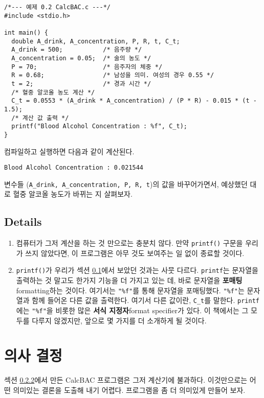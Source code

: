 \documentclass[../main.tex]{subfiles}
\begin{document}
\begin{verbatim}
/*--- 예제 0.2 CalcBAC.c ---*/
#include <stdio.h>

int main() {
  double A_drink, A_concentration, P, R, t, C_t;
  A_drink = 500;           /* 음주량 */
  A_concentration = 0.05;  /* 술의 농도 */
  P = 70;                  /* 음주자의 체중 */
  R = 0.68;                /* 남성을 의미. 여성의 경우 0.55 */
  t = 2;                   /* 경과 시간 */
  /* 혈중 알코올 농도 계산 */
  C_t = 0.0553 * (A_drink * A_concentration) / (P * R) - 0.015 * (t - 1.5);
  /* 계산 값 출력 */
  printf("Blood Alcohol Concentration : %f", C_t);
}
\end{verbatim}

컴파일하고 실행하면 다음과 같이 계산된다.
\begin{verbatim}
Blood Alcohol Concentration : 0.021544
\end{verbatim}

변수들 (\texttt{A\_drink, A\_concentration, P, R, t})의 값을
바꾸어가면서, 예상했던 대로 혈중 알코올 농도가 바뀌는 지 살펴보자.

\subsection{Details}
\begin{enumerate}
\item 컴퓨터가 그저 계산을 하는 것 만으로는 충분치 않다. 만약
  \texttt{printf()} 구문을 우리가 쓰지 않았다면, 이 프로그램은 아무
  것도 보여주는 일 없이 종료할 것이다. 
\item \texttt{printf()}가 우리가 섹션 \hyperref[sec:0.1]{0.1}에서
  보았던 것과는 사뭇 다르다. \texttt{printf}는 문자열을 출력하는 것
  말고도 한가지 기능을 더 가지고 있는 데, 바로 문자열을
  \textbf{포매팅}\small{formatting}하는 것이다. 여기서는
  \texttt{"\%f"}를 통해 문자열을 포매팅했다. \texttt{"\%f"}는 문자열과
  함께 들어온 다른 값을 출력한다. 여기서 다른 값이란, \texttt{C\_t}를
  말한다. \texttt{printf}에는 \texttt{"\%f"}을 비롯한 많은 \textbf{서식
    지정자}\small{format specifier}가 있다. 이 책에서는 그 모두를
  다루지 않겠지만, 앞으로 몇 가지를 더 소개하게 될 것이다.
\end{enumerate}

\section{의사 결정}
섹션 \hyperref[sec:0.2.2]{0.2.2}에서 만든 CalcBAC 프로그램은 그저
계산기에 불과하다. 이것만으로는 어떤 의미있는 결론을 도출해 내기
어렵다. 프로그램을 좀 더 의미있게 만들어 보자.
\end{document}
